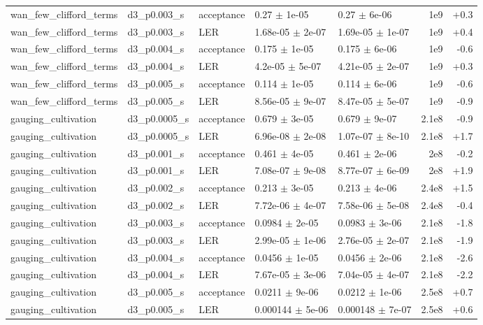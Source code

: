 \documentclass[10pt]{article}
\begin{document}
{\begin{longtable}{l l l l l r r}
wan\_few\_clifford\_terms & d3\_p0.003\_s & acceptance & 0.27 $\pm$ 1e-05 & 0.27 $\pm$ 6e-06 & 1e9 & +0.3 \\
wan\_few\_clifford\_terms & d3\_p0.003\_s & LER & 1.68e-05 $\pm$ 2e-07 & 1.69e-05 $\pm$ 1e-07 & 1e9 & +0.4 \\
wan\_few\_clifford\_terms & d3\_p0.004\_s & acceptance & 0.175 $\pm$ 1e-05 & 0.175 $\pm$ 6e-06 & 1e9 & -0.6 \\
wan\_few\_clifford\_terms & d3\_p0.004\_s & LER & 4.2e-05 $\pm$ 5e-07 & 4.21e-05 $\pm$ 2e-07 & 1e9 & +0.3 \\
wan\_few\_clifford\_terms & d3\_p0.005\_s & acceptance & 0.114 $\pm$ 1e-05 & 0.114 $\pm$ 6e-06 & 1e9 & -0.6 \\
wan\_few\_clifford\_terms & d3\_p0.005\_s & LER & 8.56e-05 $\pm$ 9e-07 & 8.47e-05 $\pm$ 5e-07 & 1e9 & -0.9 \\
gauging\_cultivation & d3\_p0.0005\_s & acceptance & 0.679 $\pm$ 3e-05 & 0.679 $\pm$ 9e-07 & 2.1e8 & -0.9 \\
gauging\_cultivation & d3\_p0.0005\_s & LER & 6.96e-08 $\pm$ 2e-08 & 1.07e-07 $\pm$ 8e-10 & 2.1e8 & +1.7 \\
gauging\_cultivation & d3\_p0.001\_s & acceptance & 0.461 $\pm$ 4e-05 & 0.461 $\pm$ 2e-06 & 2e8 & -0.2 \\
gauging\_cultivation & d3\_p0.001\_s & LER & 7.08e-07 $\pm$ 9e-08 & 8.77e-07 $\pm$ 6e-09 & 2e8 & +1.9 \\
gauging\_cultivation & d3\_p0.002\_s & acceptance & 0.213 $\pm$ 3e-05 & 0.213 $\pm$ 4e-06 & 2.4e8 & +1.5 \\
gauging\_cultivation & d3\_p0.002\_s & LER & 7.72e-06 $\pm$ 4e-07 & 7.58e-06 $\pm$ 5e-08 & 2.4e8 & -0.4 \\
gauging\_cultivation & d3\_p0.003\_s & acceptance & 0.0984 $\pm$ 2e-05 & 0.0983 $\pm$ 3e-06 & 2.1e8 & -1.8 \\
gauging\_cultivation & d3\_p0.003\_s & LER & 2.99e-05 $\pm$ 1e-06 & 2.76e-05 $\pm$ 2e-07 & 2.1e8 & -1.9 \\
gauging\_cultivation & d3\_p0.004\_s & acceptance & 0.0456 $\pm$ 1e-05 & 0.0456 $\pm$ 2e-06 & 2.1e8 & -2.6 \\
gauging\_cultivation & d3\_p0.004\_s & LER & 7.67e-05 $\pm$ 3e-06 & 7.04e-05 $\pm$ 4e-07 & 2.1e8 & -2.2 \\
gauging\_cultivation & d3\_p0.005\_s & acceptance & 0.0211 $\pm$ 9e-06 & 0.0212 $\pm$ 1e-06 & 2.5e8 & +0.7 \\
gauging\_cultivation & d3\_p0.005\_s & LER & 0.000144 $\pm$ 5e-06 & 0.000148 $\pm$ 7e-07 & 2.5e8 & +0.6 \\

\end{longtable}}
\end{document}
